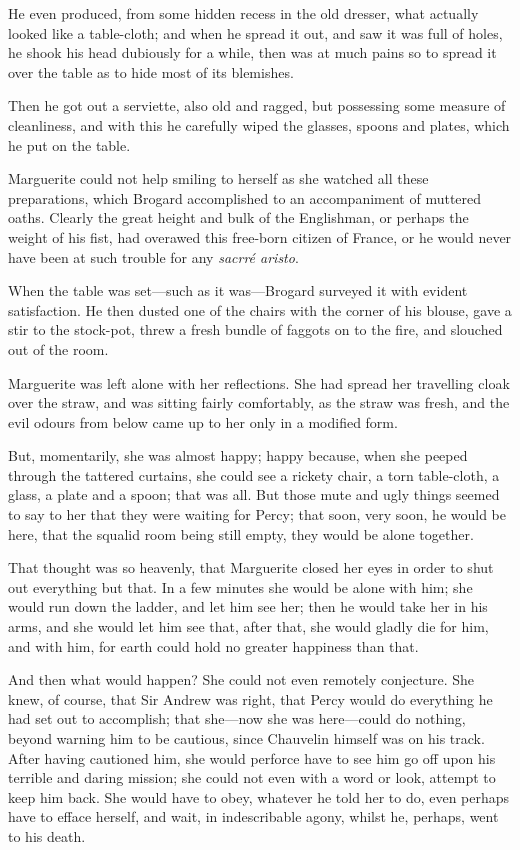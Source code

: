 \documentclass[paper=5.5in:8.5in,BCOR=7mm,twoside,DIV=calc,12pt,usegeometry,chapterprefix,endperiod,headings=big]{scrbook}
\begin{document}
He even produced, from some hidden recess in the old dresser, what actually looked like a table-cloth; and when he spread it out, and saw it was full of holes, he shook his head dubiously for a while, then was at much pains so to spread it over the table as to hide most of its blemishes.

Then he got out a serviette, also old and ragged, but possessing some measure of cleanliness, and with this he carefully wiped the glasses, spoons and plates, which he put on the table.

Marguerite could not help smiling to herself as she watched all these preparations, which Brogard accomplished to an accompaniment of muttered oaths. Clearly the great height and bulk of the Englishman, or perhaps the weight of his fist, had overawed this free-born citizen of France, or he would never have been at such trouble for any \textit{sacrré aristo}.

When the table was set---such as it was---Brogard surveyed it with evident satisfaction. He then dusted one of the chairs with the corner of his blouse, gave a stir to the stock-pot, threw a fresh bundle of faggots on to the fire, and slouched out of the room.

Marguerite was left alone with her reflections. She had spread her travelling cloak over the straw, and was sitting fairly comfortably, as the straw was fresh, and the evil odours from below came up to her only in a modified form.

But, momentarily, she was almost happy; happy because, when she peeped through the tattered curtains, she could see a rickety chair, a torn table-cloth, a glass, a plate and a spoon; that was all. But those mute and ugly things seemed to say to her that they were waiting for Percy; that soon, very soon, he would be here, that the squalid room being still empty, they would be alone together.

That thought was so heavenly, that Marguerite closed her eyes in order to shut out everything but that. In a few minutes she would be alone with him; she would run down the ladder, and let him see her; then he would take her in his arms, and she would let him see that, after that, she would gladly die for him, and with him, for earth could hold no greater happiness than that.

And then what would happen? She could not even remotely conjecture. She knew, of course, that Sir Andrew was right, that Percy would do everything he had set out to accomplish; that she---now she was here---could do nothing, beyond warning him to be cautious, since Chauvelin himself was on his track. After having cautioned him, she would perforce have to see him go off upon his terrible and daring mission; she could not even with a word or look, attempt to keep him back. She would have to obey, whatever he told her to do, even perhaps have to efface herself, and wait, in indescribable agony, whilst he, perhaps, went to his death.
\end{document}

